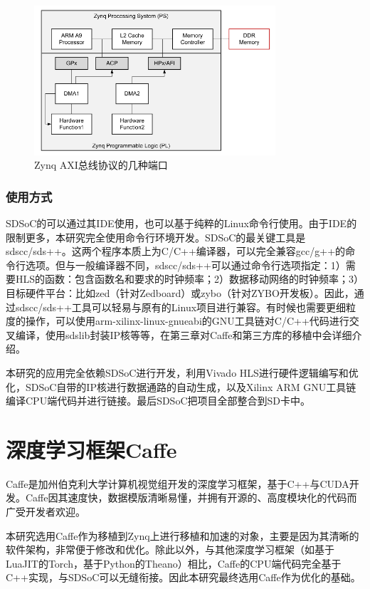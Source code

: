 \begin{figure}[!ht]
\centering
	\includegraphics[width=0.8\textwidth]{assets/imgs/zynq-axi}
\caption{Zynq AXI总线协议的几种端口}
\end{figure}

\subsubsection{使用方式}
SDSoC的可以通过其IDE使用，也可以基于纯粹的Linux命令行使用。由于IDE的限制更多，本研究完全使用命令行环境开发。SDSoC的最关键工具是sdscc/sds++。这两个程序本质上为C/C++编译器，可以完全兼容gcc/g++的命令行选项。但与一般编译器不同，sdscc/sds++可以通过命令行选项指定：1）需要HLS的函数：包含函数名和要求的时钟频率；2）数据移动网络的时钟频率；3）目标硬件平台：比如zed（针对Zedboard）或zybo（针对ZYBO开发板）。因此，通过sdscc/sds++工具可以轻易与原有的Linux项目进行兼容。有时候也需要更细粒度的操作，可以使用arm-xilinx-linux-gnueabi的GNU工具链对C/C++代码进行交叉编译，使用sdslib封装IP核等等，在第三章对Caffe和第三方库的移植中会详细介绍。

本研究的应用完全依赖SDSoC进行开发，利用Vivado HLS进行硬件逻辑编写和优化，SDSoC自带的IP核进行数据通路的自动生成，以及Xilinx ARM GNU工具链编译CPU端代码并进行链接。最后SDSoC把项目全部整合到SD卡中。

\section{深度学习框架Caffe}

Caffe是加州伯克利大学计算机视觉组开发的深度学习框架，基于C++与CUDA开发。Caffe因其速度快，数据模版清晰易懂，并拥有开源的、高度模块化的代码而广受开发者欢迎。

本研究选用Caffe作为移植到Zynq上进行移植和加速的对象，主要是因为其清晰的软件架构，非常便于修改和优化。除此以外，与其他深度学习框架（如基于LuaJIT的Torch，基于Python的Theano）相比，Caffe的CPU端代码完全基于C++实现，与SDSoC可以无缝衔接。因此本研究最终选用Caffe作为优化的基础。

